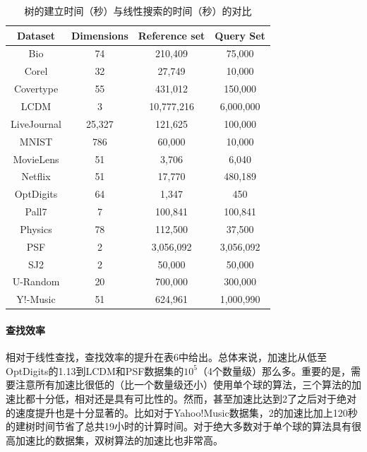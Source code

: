 \documentclass[twocolumn]{article}
\begin{document}
\begin{table}[]
\centering
\begin{tabular}{|c|c|c|c|}
\hline
Dataset     & Dimensions & Reference set & Query Set \\
\hline
Bio         & 74         & 210,409       & 75,000    \\
\hline
Corel       & 32         & 27,749        & 10,000    \\
\hline
Covertype   & 55         & 431,012       & 150,000   \\
\hline
LCDM        & 3          & 10,777,216    & 6,000,000 \\
\hline
LiveJournal & 25,327     & 121,625       & 100,000   \\
\hline
MNIST       & 786        & 60,000        & 10,000    \\
\hline
MovieLens   & 51         & 3,706         & 6,040     \\
\hline
Netflix     & 51         & 17,770        & 480,189   \\
\hline
OptDigits   & 64         & 1,347         & 450       \\
\hline
Pall7       & 7          & 100,841       & 100,841   \\
\hline
Physics     & 78         & 112,500       & 37,500    \\
\hline
PSF         & 2          & 3,056,092     & 3,056,092 \\
\hline
SJ2         & 2          & 50,000        & 50,000    \\
\hline
U-Random    & 20         & 700,000       & 300,000   \\
\hline
Y!-Music    & 51         & 624,961       & 1,000,990 \\
\hline
\end{tabular}
\caption{树的建立时间（秒）与线性搜索的时间（秒）的对比}
\label{table2}
\end{table}

\paragraph{查找效率}
相对于线性查找，查找效率的提升在表6中给出。总体来说，加速比从低至OptDigits的1.13到LCDM和PSF数据集的$10^5$（4个数量级）那么多。重要的是，需要注意所有加速比很低的（比一个数量级还小）使用单个球的算法，三个算法的加速比都十分低，相对还是具有可比性的。然而，甚至加速比达到2了之后对于绝对的速度提升也是十分显著的。比如对于Yahoo!Music数据集，2的加速比加上120秒的建树时间节省了总共19小时的计算时间。对于绝大多数对于单个球的算法具有很高加速比的数据集，双树算法的加速比也非常高。
\end{document}
